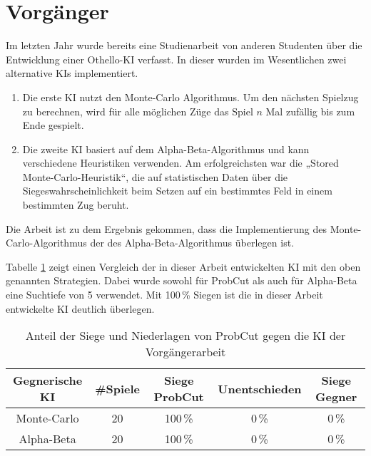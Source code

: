 
\section{Vorgänger}
Im letzten Jahr wurde bereits eine Studienarbeit von anderen Studenten über die Entwicklung einer Othello-KI verfasst.
In dieser wurden im Wesentlichen zwei alternative KIs implementiert.
\begin{enumerate}
    \item Die erste KI nutzt den Monte-Carlo Algorithmus. Um den nächsten Spielzug zu berechnen, wird für alle möglichen
    Züge das Spiel $n$ Mal zufällig bis zum Ende gespielt.
    \cite[S.~19]{othellustudienarbeit}
    \item Die zweite KI basiert auf dem Alpha-Beta-Algorithmus und kann verschiedene Heuristiken verwenden. Am
    erfolgreichsten war die „Stored Monte-Carlo-Heuristik“, die auf statistischen Daten über die
    Siegeswahrscheinlichkeit beim Setzen auf ein bestimmtes Feld in einem bestimmten Zug beruht.
    \cite[S.~30]{othellustudienarbeit}
\end{enumerate}
Die Arbeit ist zu dem Ergebnis gekommen, dass die Implementierung des Monte-Carlo-Algorithmus der des
Alpha-Beta-Algorithmus überlegen ist.
\cite[S.~55]{othellustudienarbeit}

Tabelle \ref{table:comp:previous} zeigt einen Vergleich der in dieser Arbeit entwickelten KI mit den oben genannten
Strategien. Dabei wurde sowohl für ProbCut als auch für Alpha-Beta eine Suchtiefe von 5 verwendet. Mit 100\,\% Siegen
ist die in dieser Arbeit entwickelte KI deutlich überlegen.

\begin{table}[hb]
\centering
\begin{tabular}{c|c|ccc}
\hline
Gegnerische KI & \#Spiele & Siege ProbCut & Unentschieden & Siege Gegner \\
\hline
 Monte-Carlo & 20 & 100\,\% &   0\,\% &  0\,\% \\
 Alpha-Beta  & 20 & 100\,\% &   0\,\% &  0\,\% \\
\hline
\end{tabular}
\caption{Anteil der Siege und Niederlagen von ProbCut gegen die KI der Vorgängerarbeit}
\label{table:comp:previous}
\end{table}
